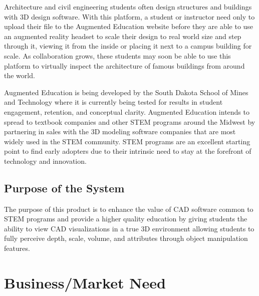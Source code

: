 Architecture and civil engineering students often design structures and buildings with 3D design software. With this platform, a student or instructor need only to upload their file to the Augmented Education website before they are able to use an augmented reality headset to scale their design to real world size and step through it, viewing it from the inside or placing it next to a campus building for scale. As collaboration grows, these students may soon be able to use this platform to virtually inspect the architecture of famous buildings from around the world. 

Augmented Education is being developed by the South Dakota School of Mines and Technology where it is currently being tested for results in student engagement, retention, and conceptual clarity. Augmented Education intends to spread to textbook companies and other STEM programs around the Midwest by partnering in sales with the 3D modeling software companies that are most widely used in the STEM community. STEM programs are an excellent starting point to find early adopters due to their intrinsic need to stay at the forefront of technology and innovation. 


\subsection{Purpose of the System}

The purpose of this product is to enhance the value of CAD software common to STEM programs and provide a higher quality education by giving students the ability to view CAD visualizations in a true 3D environment allowing students to fully perceive depth, scale, volume, and attributes through object manipulation features.


\section{Business/Market Need}



